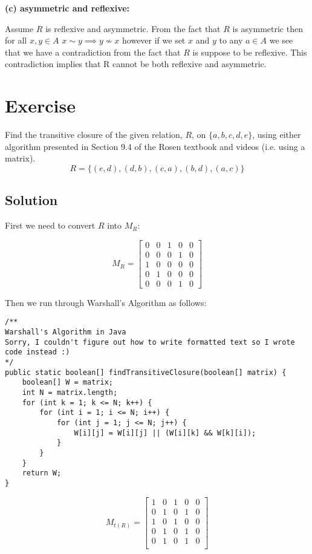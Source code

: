 \documentclass[paper=a4, fontsize=11pt]{scrartcl} %
\numberwithin{equation}{section} %
\numberwithin{figure}{section} %
\numberwithin{table}{section} %
\begin{document}
\textbf{(c) asymmetric and reflexive:}

Assume $R$ is reflexive and asymmetric. From the fact that $R$ is asymmetric then for all $x,y \in A$  $x \sim y \implies y \not\sim x$ however if we set $x$ and $y$ to any $a \in A$ we see that we have a contradiction from the fact that $R$ is suppose to be reflexive. This contradiction implies that R cannot be both reflexive and asymmetric.



\section{Exercise}

Find the transitive closure of the given relation, $R$, on $\{a,b,c,d,e\}$, using either algorithm presented in Section 9.4 of the Rosen textbook and videos (i.e. using a matrix).
$$R = \{(e,d),(d,b),(c,a),(b,d),(a,c)\}$$

\subsection{Solution}

First we need to convert $R$ into $M_R$:

$$M_R = \begin{bmatrix}
0 & 0 & 1 & 0 & 0 \\
0 & 0 & 0 & 1 & 0 \\
1 & 0 & 0 & 0 & 0 \\
0 & 1 & 0 & 0 & 0 \\
0 & 0 & 0 & 1 & 0
\end{bmatrix}$$

Then we run through Warshall's Algorithm as follows:

\begin{lstlisting}
/**
Warshall's Algorithm in Java
Sorry, I couldn't figure out how to write formatted text so I wrote code instead :)
*/
public static boolean[] findTransitiveClosure(boolean[] matrix) {
	boolean[] W = matrix;
	int N = matrix.length;
	for (int k = 1; k <= N; k++) {
		for (int i = 1; i <= N; i++) {
			for (int j = 1; j <= N; j++) {
				W[i][j] = W[i][j] || (W[i][k] && W[k][i]);
			}
		}
	}
	return W;
}
\end{lstlisting}

$$M_{t(R)} = \begin{bmatrix}
1 & 0  & 1 & 0 & 0 	\\
0 & 1 & 0 & 1 & 0 	\\
1 & 0 & 1 & 0 & 0 	\\
0 & 1 & 0 & 1 & 0 	\\
0 & 1 & 0 & 1 & 0	\\
\end{bmatrix}$$
\end{document}
